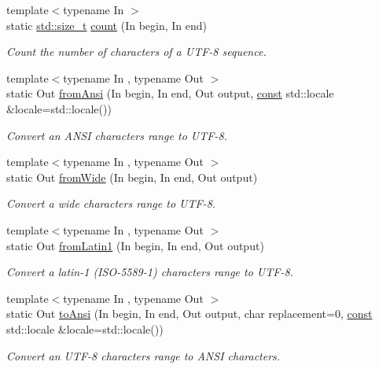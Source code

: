 \begin{DoxyCompactItemize}
{\footnotesize template$<$typename In $>$ }\\static \hyperlink{nc__alloc_8h_a7b60c5629e55e8ec87a4547dd4abced4}{std\-::size\-\_\-t} \hyperlink{classsf_1_1_utf_3_018_01_4_af1f15d9a772ee887be39e97431e15d32}{count} (In begin, In end)
\begin{DoxyCompactList}\small\item\em Count the number of characters of a U\-T\-F-\/8 sequence. \end{DoxyCompactList}\item 
{\footnotesize template$<$typename In , typename Out $>$ }\\static Out \hyperlink{classsf_1_1_utf_3_018_01_4_a1b62ba85ad3c8ce68746e16192b3eef0}{from\-Ansi} (In begin, In end, Out output, \hyperlink{term__entry_8h_a57bd63ce7f9a353488880e3de6692d5a}{const} std\-::locale \&locale=std\-::locale())
\begin{DoxyCompactList}\small\item\em Convert an A\-N\-S\-I characters range to U\-T\-F-\/8. \end{DoxyCompactList}\item 
{\footnotesize template$<$typename In , typename Out $>$ }\\static Out \hyperlink{classsf_1_1_utf_3_018_01_4_aa99e636a7addc157b425dfc11b008f42}{from\-Wide} (In begin, In end, Out output)
\begin{DoxyCompactList}\small\item\em Convert a wide characters range to U\-T\-F-\/8. \end{DoxyCompactList}\item 
{\footnotesize template$<$typename In , typename Out $>$ }\\static Out \hyperlink{classsf_1_1_utf_3_018_01_4_a85dd3643b7109a1a2f802747e55e28e8}{from\-Latin1} (In begin, In end, Out output)
\begin{DoxyCompactList}\small\item\em Convert a latin-\/1 (I\-S\-O-\/5589-\/1) characters range to U\-T\-F-\/8. \end{DoxyCompactList}\item 
{\footnotesize template$<$typename In , typename Out $>$ }\\static Out \hyperlink{classsf_1_1_utf_3_018_01_4_a3d8b02f29021bd48831e7706d826f0c5}{to\-Ansi} (In begin, In end, Out output, char replacement=0, \hyperlink{term__entry_8h_a57bd63ce7f9a353488880e3de6692d5a}{const} std\-::locale \&locale=std\-::locale())
\begin{DoxyCompactList}\small\item\em Convert an U\-T\-F-\/8 characters range to A\-N\-S\-I characters. \end{DoxyCompactList}\item 

\end{DoxyCompactItemize}
